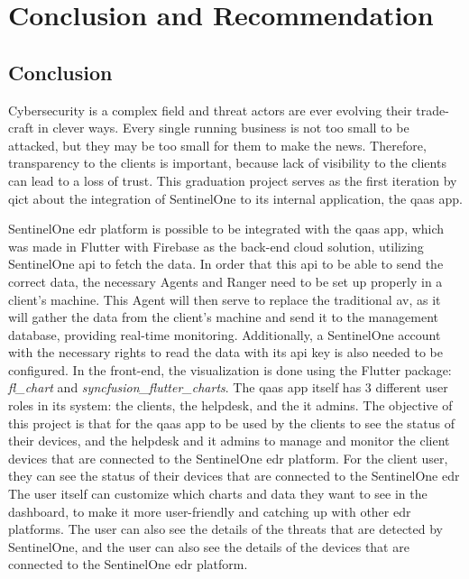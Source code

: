 \chapter{Conclusion and Recommendation}
\section{Conclusion}
Cybersecurity is a complex field and threat actors are ever evolving their trade-craft in clever ways. Every single
running business is not too small to be attacked, but they may be too small for them to make the news. Therefore, transparency
to the clients is important, because lack of visibility to the clients can lead to a loss of trust. This graduation project serves as the
first iteration by \acrshort{qict} about the integration of SentinelOne to its internal application, the \acrshort{qaas} app.

SentinelOne \acrshort{edr} platform is possible to be integrated with the \acrshort{qaas} app, which was made in Flutter with
Firebase as the back-end cloud solution, utilizing SentinelOne \acrshort{api} to fetch the data. In order that this \acrshort{api}
to be able to send the correct data, the necessary Agents and Ranger need to be set up properly in a client's machine. This Agent will then serve
to replace the traditional \acrshort{av}, as it will gather the data from the client's machine and send it to the management database, providing real-time
monitoring. Additionally, a SentinelOne account with the necessary rights to read the data with its \acrshort{api} key is also needed to be configured. In the
front-end, the visualization is done using the Flutter package: \textit{fl\_chart} and \textit{syncfusion\_flutter\_charts}. The \acrshort{qaas} app itself has 3
different user roles in its system: the clients, the helpdesk, and the \acrshort{it} admins. The objective of this project is that for the \acrshort{qaas} app to
be used by the clients to see the status of their devices, and the helpdesk and \acrshort{it} admins to manage and monitor the client devices that are connected to
the SentinelOne \acrshort{edr} platform. For the client user, they can see the status of their devices that are connected to the SentinelOne \acrshort{edr}
The user itself can customize which charts and data they want to see in the dashboard,
to make it more user-friendly and catching up with other \acrshort{edr} platforms. The user can also see the details of the
threats that are detected by SentinelOne, and the user can also see the details of the devices that are connected to the SentinelOne
\acrshort{edr} platform.

